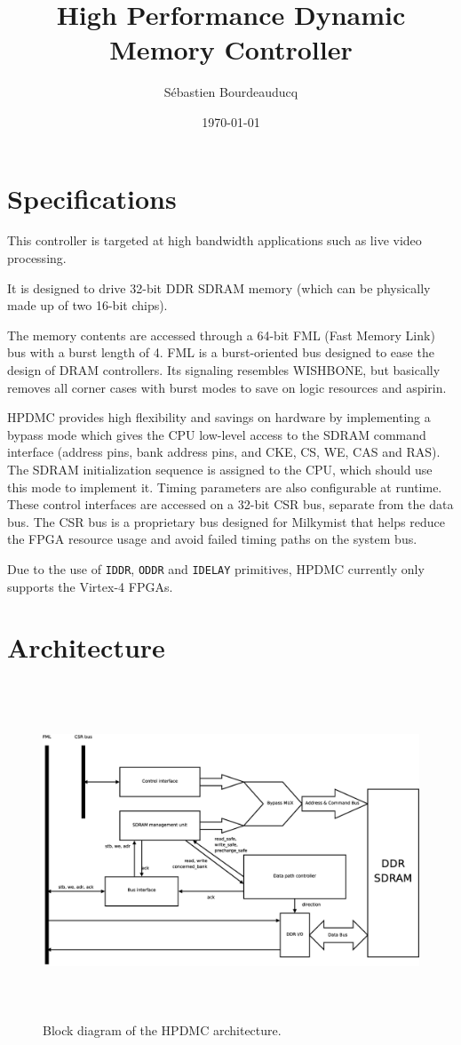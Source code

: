 \documentclass[a4paper,11pt]{article}
\title{High Performance Dynamic Memory Controller}
\author{S\'ebastien Bourdeauducq}
\date{\today}
\begin{document}
\maketitle{}
\section{Specifications}
This controller is targeted at high bandwidth applications such as live video processing.

It is designed to drive 32-bit DDR SDRAM memory (which can be physically made up of two 16-bit chips).

The memory contents are accessed through a 64-bit FML (Fast Memory Link) bus with a burst length of 4. FML is a burst-oriented bus designed to ease the design of DRAM controllers. Its signaling resembles WISHBONE, but basically removes all corner cases with burst modes to save on logic resources and aspirin.

HPDMC provides high flexibility and savings on hardware by implementing a bypass mode which gives the CPU low-level access to the SDRAM command interface (address pins, bank address pins, and CKE, CS, WE, CAS and RAS). The SDRAM initialization sequence is assigned to the CPU, which should use this mode to implement it. Timing parameters are also configurable at runtime. These control interfaces are accessed on a 32-bit CSR bus, separate from the data bus. The CSR bus is a proprietary bus designed for Milkymist that helps reduce the FPGA resource usage and avoid failed timing paths on the system bus.

Due to the use of \verb!IDDR!, \verb!ODDR! and \verb!IDELAY! primitives, HPDMC currently only supports the Virtex-4 FPGAs.

\section{Architecture}

\begin{figure}[H]
\centering
\includegraphics[height=100mm]{blockdiagram.eps}
\caption{Block diagram of the HPDMC architecture.}\label{fig:blockdiagram}
\end{figure}
\end{document}
